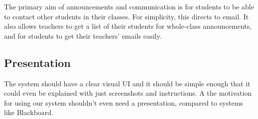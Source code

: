 \documentclass{article}
\begin{document}
The primary aim of announcements and communication is for students to be able
to contact other students in their classes. For simplicity, this directs to
email. It also allows teachers to get a list of their students for whole-class
announcements, and for students to get their teachers' emails easily.

\subsection{Presentation}

The system should have a clear visual UI and it should be simple enough that it
could even be explained with just screenshots and instructions. A the
motivation for using our system shouldn't even need a presentation, compared to
systems like Blackboard.

{} 
\end{document}

